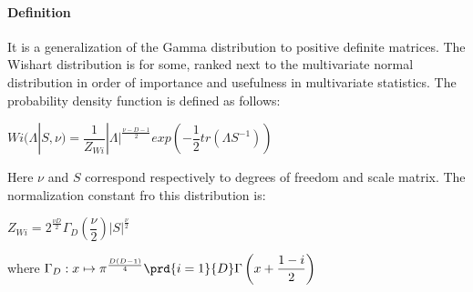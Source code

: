 \paragraph{Definition}
It is a generalization of the Gamma distribution to positive definite matrices.
The Wishart distribution is for some, ranked next to the multivariate normal distribution
in order of importance and usefulness in multivariate statistics.
The probability density function is defined as follows:
\begin{center}
    $Wi(\Lambda|S,\nu) = \dfrac{1}{Z_{Wi}}|\Lambda|^{\frac{\nu-D-1}{2}}exp\left(
    -\dfrac{1}{2}tr(\Lambda S^{-1})\right)$
\end{center}
Here $\nu$ and $S$ correspond respectively to degrees of freedom and scale matrix.
The normalization constant fro this distribution is:
\begin{center}
    $Z_{Wi} = 2^{\frac{\nu D}{2}}\Gamma_{D}\left(\dfrac{\nu}{2}\right)|S|^{\frac{\nu}{2}}$
\end{center}
where $\Gamma_{D}: x\mapsto \pi^{\frac{D(D-1)}{4}}\prd{i=1}{D}\Gamma\left(x+\dfrac{1-i}
    {2}\right)$


